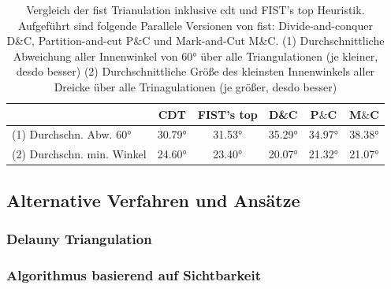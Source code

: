 \begin{table}[h]
    \begin{tabular}[h]{| l | c | c | c | c | c |}
    \hline
    & CDT & FIST's top & D\&C & P$\&$C & M$\&$C \\ \hline
    (1) Durchschn. Abw. 60° & 30.79° & 31.53° & 35.29° & 34.97° & 38.38° \\ \hline
    (2) Durchschn. min. Winkel & 24.60° & 23.40° & 20.07° & 21.32° & 21.07° \\ \hline
    \end{tabular}
    \caption[Vergleich verschiedener Parallelisierungen des \ac{eca} in \ac{fist}]{Vergleich der \ac{fist} Trianulation inklusive \ac{cdt} und FIST's top Heuristik. Aufgeführt sind folgende Parallele Versionen von \ac{fist}: 
    Divide-and-conquer D\&C, Partition-and-cut P\&C und Mark-and-Cut M\&C. 
    (1) Durchschnittliche Abweichung aller Innenwinkel von 60° über alle Triangulationen (je kleiner, desdo besser) 
    (2) Durchschnittliche Größe des kleinsten Innenwinkels aller Dreicke über alle Trinagulationen (je größer, desdo besser) \cite{paralleleca}}
    \label{tab:tab1}
\end{table}

\subsection{Alternative Verfahren und Ansätze} 

\subsubsection{Delauny Triangulation}



\subsubsection{Algorithmus basierend auf Sichtbarkeit}

